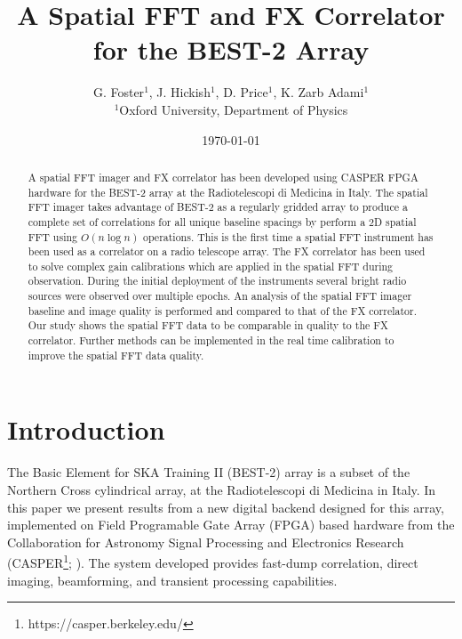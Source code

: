 \documentclass[useAMS,macros,usenatbib,onecolumn]{mn2e}
\title[]{A Spatial FFT and FX Correlator for the BEST-2 Array}
\author[G. Foster, J. Hickish, D. Price and K. Zarb Adami]{G. Foster$^{1}$, J. Hickish$^{1}$, D. Price$^{1}$, K. Zarb Adami$^{1}$\\
$^{1}$Oxford University, Department of Physics}
\begin{document}
\date{\today}

\pagerange{\pageref{firstpage}--\pageref{lastpage}} 

\maketitle

\begin{abstract}
A spatial FFT imager and FX correlator has been developed using CASPER FPGA hardware for the BEST-2 array at the Radiotelescopi di Medicina in Italy.
The spatial FFT imager takes advantage of BEST-2 as a regularly gridded array to produce a complete set of correlations for all unique baseline spacings by perform a 2D spatial FFT using $O(n \log n)$ operations.
This is the first time a spatial FFT instrument has been used as a correlator on a radio telescope array.
The FX correlator has been used to solve complex gain calibrations which are applied in the spatial FFT during observation.
During the initial deployment of the instruments several bright radio sources were observed over multiple epochs.
An analysis of the spatial FFT imager baseline and image quality is performed and compared to that of the FX correlator.
Our study shows the spatial FFT data to be comparable in quality to the FX correlator.
Further methods can be implemented in the real time calibration to improve the spatial FFT data quality.
\end{abstract}

\section{Introduction}

The Basic Element for SKA Training II (BEST-2) array is a subset of the Northern Cross cylindrical array, at the Radiotelescopi di Medicina in Italy.
In this paper we present results from a new digital backend designed for this array, implemented on Field Programable Gate Array (FPGA) based hardware from the Collaboration for Astronomy Signal Processing and Electronics Research (CASPER\footnote{https://casper.berkeley.edu/}; \cite{casper}). The system developed provides fast-dump correlation, direct imaging, beamforming, and transient processing capabilities.
\end{document}
